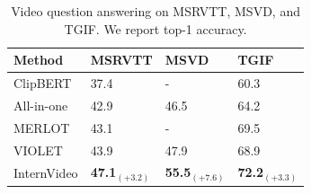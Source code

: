 \begin{table}[t]
    \centering
    \caption{{Video question answering on MSRVTT, MSVD, and TGIF. We report top-1 accuracy.}
    }
    \begin{tabular}[htop]{l l l l}
        \toprule
        Method  & MSRVTT & MSVD & TGIF \\
        \midrule
        ClipBERT~\cite{clipbert} & 37.4 & - &  60.3 \\
        All-in-one~\cite{all_in_one} & 42.9 & 46.5 & 64.2 \\
        MERLOT~\cite{merlot} & 43.1 & - & {69.5} \\
        VIOLET~\cite{violet} & {43.9} & {47.9} & 68.9 \\
        InternVideo & \textbf{47.1}$_{(+3.2)}$ & \textbf{55.5}$_{(+7.6)}$ & \textbf{72.2}$_{(+3.3)}$ \\
        \bottomrule
    \end{tabular}
    \label{tab:vqa}
    \vspace{-0.1cm}
\end{table}